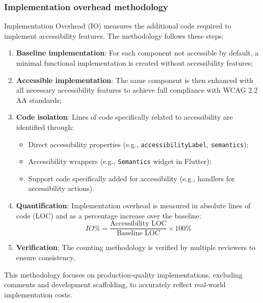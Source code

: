 \subsubsection{Implementation overhead methodology}
\label{subsubsec:io-methodology}

Implementation Overhead (IO) measures the additional code required to implement accessibility features. The methodology follows these steps:

\begin{enumerate}
    \item \textbf{Baseline implementation}: For each component not accessible by default, a minimal functional implementation is created without accessibility features;
    
    \item \textbf{Accessible implementation}: The same component is then enhanced with all necessary accessibility features to achieve full compliance with WCAG 2.2 AA standards;
    
    \item \textbf{Code isolation}: Lines of code specifically related to accessibility are identified through:
    \begin{itemize}
        \item Direct accessibility properties (e.g., \texttt{accessibilityLabel}, \texttt{semantics});
        \item Accessibility wrappers (e.g., \texttt{Semantics} widget in Flutter);
        \item Support code specifically added for accessibility (e.g., handlers for accessibility actions).
    \end{itemize}
    
    \item \textbf{Quantification}: Implementation overhead is measured in absolute lines of code (LOC) and as a percentage increase over the baseline:
    \begin{equation}
    IO\% = \frac{\text{Accessibility LOC}}{\text{Baseline LOC}} \times 100\%
    \end{equation}
    
    \item \textbf{Verification}: The counting methodology is verified by multiple reviewers to ensure consistency.
\end{enumerate}

This methodology focuses on production-quality implementations, excluding comments and development scaffolding, to accurately reflect real-world implementation costs.

